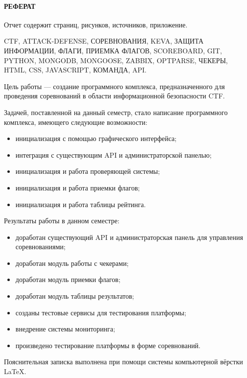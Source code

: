\newpage
{}
\paragraph{\hfill РЕФЕРАТ \hfill}

Отчет содержит  страниц,  рисунков,  источников,  приложение.

CTF, ATTACK-DEFENSE, СОРЕВНОВАНИЯ, KEVA, ЗАЩИТА ИНФОРМАЦИИ, ФЛАГИ, ПРИЕМКА ФЛАГОВ, SCOREBOARD, GIT, PYTHON, MONGODB, MONGOOSE, ZABBIX, OPTPARSE, ЧЕКЕРЫ, HTML, CSS, JAVASCRIPT, КОМАНДА, API.

Цель работы --- создание программного комплекса, предназначенного для проведения соревнований в области информационной безопасности CTF.

Задачей, поставленной на данный семестр, стало написание программного комплекса, имеющего следующие возможности: 
\begin{itemize}
\item инициализация с помощью графического интерфейса;
\item интеграция с существующим API и администраторской панелью; 
\item инициализация и работа проверяющей системы;
\item инициализация и работа приемки флагов;
\item инициализация и работа таблицы рейтинга.
\end{itemize}

Результаты работы в данном семестре:

\begin{itemize}
\item доработан существующий API и администраторская панель для управления соревнованиями; 
\item доработан модуль работы с чекерами;
\item доработан модуль приемки флагов;
\item доработан модуль таблицы результатов;
\item созданы тестовые сервисы для тестирования платформы;
\item внедрение системы мониторинга;
\item произведено тестирование платформы в форме соревнований.
\end{itemize}

Пояснительная записка выполнена при помощи системы компьютерной вёрстки \LaTeX.
